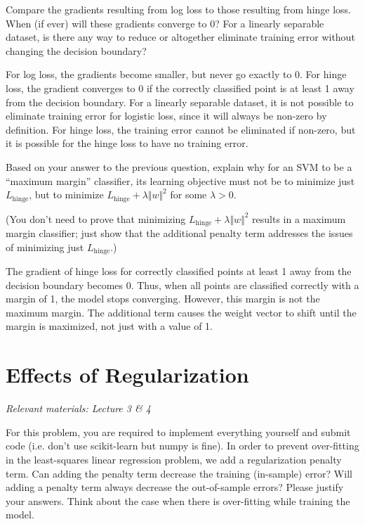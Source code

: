 \problem[4]
Compare the gradients resulting from log loss to those resulting from hinge loss. When (if ever) will these gradients converge to 0? For a linearly separable dataset, is there any way to reduce or altogether eliminate training error without changing the decision boundary?

\begin{solution}
  For log loss, the gradients become smaller, but never go exactly to 0. For hinge loss, the gradient converges to 0 if the correctly classified point is at least 1 away from the decision boundary. For a linearly separable dataset, it is not possible to eliminate training error for logistic loss, since it will always be non-zero by definition. For hinge loss, the training error cannot be eliminated if non-zero, but it is possible for the hinge loss to have no training error.
\end{solution}

\problem[5]
Based on your answer to the previous question, explain why for an SVM to be a ``maximum margin'' classifier, its learning objective must not be to minimize just $L_\text{hinge}$, but to minimize $L_\text{hinge} + \lambda\Vert w \Vert^2$ for some $\lambda > 0$.

(You don't need to prove that minimizing $L_\text{hinge} + \lambda\Vert w \Vert^2$ results in a maximum margin classifier; just show that the additional penalty term addresses the issues of minimizing just $L_\text{hinge}$.)

\begin{solution}
  The gradient of hinge loss for correctly classified points at least 1 away from the decision boundary becomes 0. Thus, when all points are classified correctly with a margin of 1, the model stops converging. However, this margin is not the maximum margin. The additional term causes the weight vector to shift until the margin is maximized, not just with a value of 1.
\end{solution}

\newpage
\section{Effects of Regularization}
\textit{Relevant materials: Lecture 3 \& 4}

For this problem, you are required to implement everything yourself and submit code (i.e. don't use scikit-learn but numpy is fine).
\indent\problem[4] 
In order to prevent over-fitting in the least-squares linear regression problem, we add a regularization penalty term.
Can adding the penalty term decrease the training (in-sample) error?
Will adding a penalty term always decrease the out-of-sample errors?
Please justify your answers. Think about the case when there is over-fitting while training the model.

